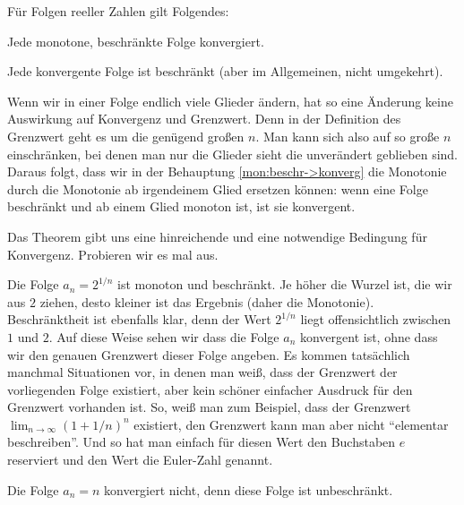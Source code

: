 \begin{thm} 
	\label{thm:monot:beschr:folgen} 
	Für Folgen reeller Zahlen gilt Folgendes: 
	\begin{enuma}
		\item \label{mon:beschr->konverg} Jede monotone, beschränkte Folge konvergiert. 
		\item Jede konvergente Folge ist beschränkt (aber im Allgemeinen, nicht umgekehrt). 
	\end{enuma} 
\end{thm} 

\begin{bem}
	Wenn wir in einer Folge endlich viele Glieder ändern, hat so eine Änderung keine Auswirkung auf Konvergenz und Grenzwert. Denn in der Definition des Grenzwert geht es um die genügend großen $n$. Man kann sich also auf so große $n$ einschränken, bei denen man nur die Glieder sieht die unverändert geblieben sind. Daraus folgt, dass wir 
	in der Behauptung \ref{mon:beschr->konverg} die Monotonie durch die Monotonie ab irgendeinem Glied ersetzen können: wenn eine Folge beschränkt und ab einem Glied monoton ist, ist sie konvergent. 
\end{bem} 

\begin{bsp} 
	Das Theorem gibt uns eine hinreichende und eine notwendige Bedingung für Konvergenz. Probieren wir es mal aus. 
	\begin{enuma}
		\item Die Folge $a_n = 2^{1/n}$ ist monoton und beschränkt. Je höher die Wurzel ist, die wir aus $2$ ziehen, desto kleiner ist das Ergebnis (daher die Monotonie). Beschränktheit ist ebenfalls klar, denn der Wert $2^{1/n}$ liegt offensichtlich zwischen $1$ und $2$. Auf diese Weise sehen wir dass die Folge $a_n$ konvergent ist, ohne dass wir den genauen Grenzwert dieser Folge angeben. Es kommen tatsächlich manchmal Situationen vor, in denen man weiß, dass der Grenzwert der vorliegenden Folge existiert, aber kein schöner einfacher Ausdruck für den Grenzwert vorhanden ist. So, weiß man zum Beispiel, dass der Grenzwert $\lim_{n \to \infty} (1+ 1/n)^n$ existiert, den Grenzwert kann man aber nicht ``elementar beschreiben''. Und so hat man einfach für diesen Wert den Buchstaben $e$ reserviert und den Wert die Euler-Zahl genannt. 
		\item Die Folge $a_n = n$ konvergiert nicht, denn diese Folge ist unbeschränkt. 
	\end{enuma} 
\end{bsp} 

